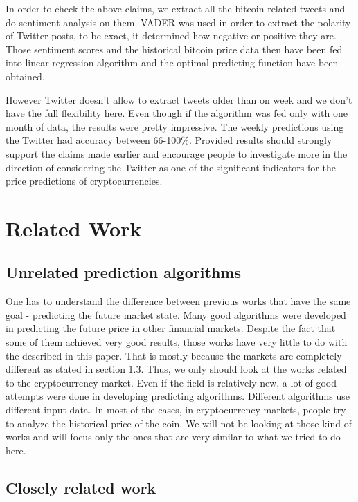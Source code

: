 \documentclass[a4paper,11pt,oneside]{article}
\begin{document}
  In order to check the above claims, we extract all the bitcoin related tweets and do sentiment analysis on them. VADER \cite{vader} was used in order to extract the polarity of Twitter posts, to be exact, it determined how negative or positive they are. Those sentiment scores and the historical bitcoin price data then have been fed into linear regression algorithm and the optimal predicting function have been obtained.
  
  However Twitter doesn't allow to extract tweets older than on week and we don't have the full flexibility here. Even though if the algorithm was fed only with one month of data, the results were pretty impressive. The weekly predictions using the Twitter had accuracy between 66-100\%. Provided results should  strongly support the claims made earlier and encourage people to investigate more in the direction of considering the Twitter as one of the significant indicators for the price predictions of cryptocurrencies.
  

  \section{Related Work}
  
  \subsection{Unrelated prediction algorithms}

  One has to understand the difference between previous works that have the same goal - predicting the future market state. Many good algorithms were developed in predicting the future price in other financial markets. Despite the fact that some of them achieved very good results, those works have very little to do with the described in this paper. That is mostly because the markets are completely different as stated in section 1.3. Thus, we only should look at the works related to the cryptocurrency market. Even if the field is relatively new, a lot of good attempts were done in developing predicting algorithms. Different algorithms use different input data. In most of the cases, in cryptocurrency markets, people try to analyze the historical price of the coin. We will not be looking at those kind of works and will focus only the ones that are very similar to what we tried to do here.
  
  \subsection{Closely related work}
  
\end{document}
